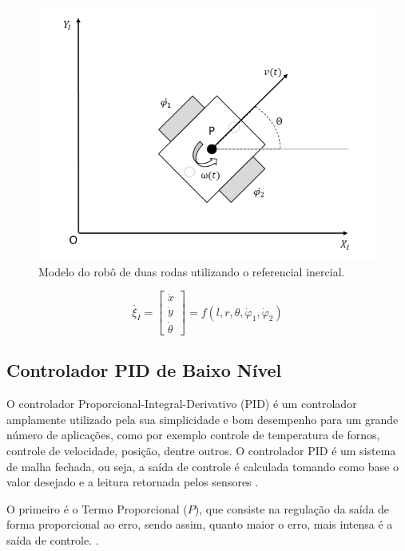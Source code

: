 \documentclass[a4paper]{ifacconf}
\begin{document}
\begin{figure}
\begin{center}
\includegraphics[scale=0.5]{Figuras/mod_mov.png}
\caption{Modelo do robô de duas rodas utilizando o referencial inercial.}
\label{fig:mod_mov}
\end{center}
\end{figure}

\begin{equation} \label{eq:mod_mov}
\dot{\xi_{I}} =
\begin{bmatrix}
\dot{x} \\
\dot{y} \\
\dot{\theta}
\end{bmatrix}=f(l,r,\theta,\dot{\varphi}_{1},\dot{\varphi}_{2}) 
\end{equation}

\subsection{Controlador PID de Baixo Nível}

O controlador Proporcional-Integral-Derivativo (PID) é um controlador amplamente utilizado pela sua simplicidade e bom desempenho para um grande número de aplicações, como por exemplo controle de temperatura de fornos, controle de velocidade, posição, dentre outros. O controlador PID é um sistema de malha fechada, ou seja, a saída de controle é calculada tomando como base o valor desejado e a leitura retornada pelos sensores \cite{pid_autotune_relay, pid_engine_tuning,embarcados_pid_1}.

O primeiro é o Termo Proporcional ($P$), que consiste na regulação da saída de forma proporcional ao erro, sendo assim, quanto maior o erro, mais intensa é a saída de controle. \cite{pid_autotune_relay,embarcados_pid_1}.
\end{document}
